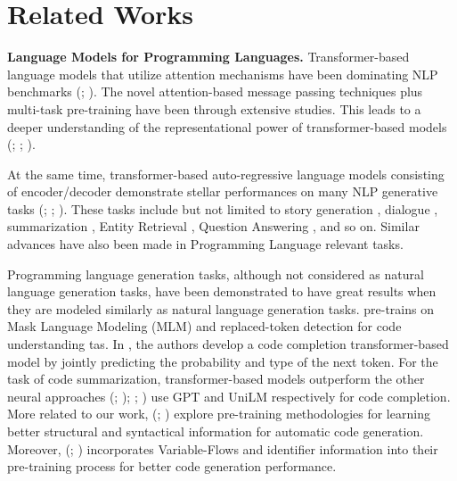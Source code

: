 \documentclass[11pt]{article}
\begin{document}
\section{Related Works}

\textbf{Language Models for Programming Languages.} Transformer-based language models that utilize attention mechanisms have been dominating NLP benchmarks (\citealp[]{Vaswani2017AttentionIA}; \citealp[]{Wang2018GLUEAM}). The novel attention-based message passing techniques plus multi-task pre-training \citep{Devlin2019BERTPO} have been through extensive studies. This leads to a deeper understanding of the representational power of transformer-based models (\citealp[]{Ethayarajh2019HowCA}; \citealp[]{Kovaleva2019RevealingTD}; \citealp[]{Jain2019AttentionIN}).

At the same time, transformer-based auto-regressive language models consisting of encoder/decoder demonstrate stellar performances on many NLP generative tasks (\citealp[]{Radford2019LanguageMA}; \citealp[]{Lewis2020BARTDS}; \citealp[]{Raffel2020ExploringTL}). These tasks include but not limited to story generation \citep{See2019DoMP}, dialogue \citep{Budzianowski2019HelloIG}, summarization \citep{Lewis2020BARTDS}, Entity Retrieval \citep{DeCao2021AutoregressiveER}, Question Answering \citep{Guu2020REALMRL}, and so on. Similar advances have also been made in Programming Language relevant tasks. 

Programming language generation tasks, although not considered as natural language generation tasks, have been demonstrated to have great results when they are modeled similarly as natural language generation tasks. \citep{Feng2020CodeBERTAP} pre-trains on Mask Language Modeling (MLM) and replaced-token detection for code understanding tas. In \citep{Liu2020MultitaskLB}, the authors develop a code completion transformer-based model by jointly predicting the probability and type of the next token. For the task of code summarization, transformer-based models outperform the other neural approaches (\citealp[]{Yu2020TowardsCC}; \citealp[]{Ahmad2020ATA}); \citealp[]{10.1145/3368089.3417058}; \citealp[]{Liu2020MultitaskLB}) use GPT and UniLM respectively for code completion.
More related to our work, (\citealp[]{Husain2019CodeSearchNetCE}; \citealp[]{Clement2020PyMT5MT}) explore pre-training methodologies for learning better structural and syntactical information for automatic code generation. Moreover, (\citealp[]{wang2021codet5}; \citealp[]{guo2021graphcodebert}) incorporates Variable-Flows and identifier information into their pre-training process for better code generation performance.
\end{document}
